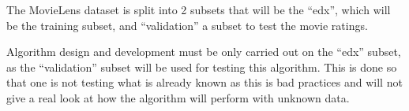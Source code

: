 \documentclass[
]{article}
\newenvironment{Shaded}{\begin{snugshade}}{\end{snugshade}}
\newcommand{\CharTok}[1]{\textcolor[rgb]{0.31,0.60,0.02}{#1}}
\newcommand{\CommentTok}[1]{\textcolor[rgb]{0.56,0.35,0.01}{\textit{#1}}}
\newcommand{\DataTypeTok}[1]{\textcolor[rgb]{0.13,0.29,0.53}{#1}}
\newcommand{\DecValTok}[1]{\textcolor[rgb]{0.00,0.00,0.81}{#1}}
\newcommand{\KeywordTok}[1]{\textcolor[rgb]{0.13,0.29,0.53}{\textbf{#1}}}
\newcommand{\NormalTok}[1]{#1}
\newcommand{\OperatorTok}[1]{\textcolor[rgb]{0.81,0.36,0.00}{\textbf{#1}}}
\newcommand{\StringTok}[1]{\textcolor[rgb]{0.31,0.60,0.02}{#1}}
\begin{document}
\begin{Shaded}
\end{Shaded}

The MovieLens dataset is split into 2 subsets that will be the ``edx'',
which will be the training subset, and ``validation'' a subset to test
the movie ratings.

Algorithm design and development must be only carried out on the ``edx''
subset, as the ``validation'' subset will be used for testing this
algorithm. This is done so that one is not testing what is already known
as this is bad practices and will not give a real look at how the
algorithm will perform with unknown data.
\end{document}
